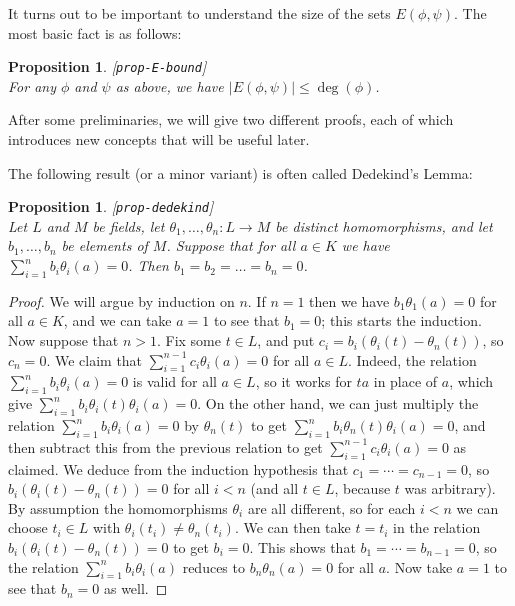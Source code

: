 \documentclass{amsart}
\newcommand{\lbl}[1]{\label{#1}\textup{[\texttt{#1}]}\ \\}
\newcommand{\lbl}{\label}
\newcommand{\tht}       {\theta}
\renewcommand{\:}{\colon}
\newtheorem{proposition}[theorem]{Proposition}
\theoremstyle{definition}
\begin{document}
It turns out to be important to understand the size of the sets
$E(\phi,\psi)$.  The most basic fact is as follows:

\begin{proposition}\lbl{prop-E-bound}
 For any $\phi$ and $\psi$ as above, we have
 $|E(\phi,\psi)|\leq\deg(\phi)$.  
\end{proposition}

After some preliminaries, we will give two different proofs, each of
which introduces new concepts that will be useful later.

The following result (or a minor variant) is often called Dedekind's
Lemma:  
\begin{proposition}\lbl{prop-dedekind}
 Let $L$ and $M$ be fields, let $\tht_1,\dotsc,\tht_n\:L\to M$ be
 distinct homomorphisms, and let $b_1,\dotsc,b_n$ be elements of $M$.
 Suppose that for all $a\in K$ we have $\sum_{i=1}^nb_i\tht_i(a)=0$.
 Then $b_1=b_2=\dotsc=b_n=0$.
\end{proposition}
\begin{proof}
 We will argue by induction on $n$.  If $n=1$ then we have
 $b_1\tht_1(a)=0$ for all $a\in K$, and we can take $a=1$ to see that
 $b_1=0$; this starts the induction.  Now suppose that $n>1$.  Fix
 some $t\in L$, and put $c_i=b_i(\tht_i(t)-\tht_n(t))$, so $c_n=0$.
 We claim that $\sum_{i=1}^{n-1}c_i\tht_i(a)=0$ for all $a\in L$.
 Indeed, the relation $\sum_{i=1}^nb_i\tht_i(a)=0$ is valid for all
 $a\in L$, so it works for $ta$ in place of $a$, which give
 $\sum_{i=1}^nb_i\tht_i(t)\tht_i(a)=0$.  On the other hand, we can
 just multiply the relation $\sum_{i=1}^nb_i\tht_i(a)=0$ by
 $\tht_n(t)$ to get $\sum_{i=1}^nb_i\tht_n(t)\tht_i(a)=0$, and then
 subtract this from the previous relation to get
 $\sum_{i=1}^{n-1}c_i\tht_i(a)=0$ as claimed.  We deduce from the
 induction hypothesis that $c_1=\dotsb=c_{n-1}=0$, so
 $b_i(\tht_i(t)-\tht_n(t))=0$ for all $i<n$ (and all $t\in L$, because
 $t$ was arbitrary).  By assumption the homomorphisms $\tht_i$ are all
 different, so for each $i<n$ we can choose $t_i\in L$ with
 $\tht_i(t_i)\neq\tht_n(t_i)$.  We can then take $t=t_i$ in the
 relation $b_i(\tht_i(t)-\tht_n(t))=0$ to get $b_i=0$.  This shows
 that $b_1=\dotsb=b_{n-1}=0$, so the relation
 $\sum_{i=1}^nb_i\tht_i(a)$ reduces to $b_n\tht_n(a)=0$ for all $a$.
 Now take $a=1$ to see that $b_n=0$ as well.
\end{proof}
\end{document}
